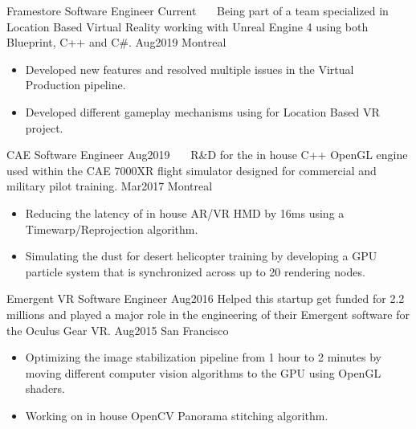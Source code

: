 %
%
%

\begin{experiences}
  \experience
    {Framestore}   			{Software Engineer}
    {Current~~~} 			{Being part of a team specialized in Location Based Virtual Reality working with Unreal Engine 4 using both Blueprint, C++ and C\#.}
	{Aug2019}	 	
	{Montreal}			{
						  \begin{itemize}
							\item Developed new features and resolved multiple issues in the Virtual Production pipeline.
							\item Developed different gameplay mechanisms using for Location Based VR project.
						  \end{itemize}
						 }
   \emptySeparator

  \experience
    {CAE}   				{Software Engineer}
    {Aug2019~~~} 			{R\&D for the in house C++ OpenGL engine used within the CAE 7000XR flight simulator designed for commercial and military pilot training.}
	{Mar2017}	 	
	{Montreal}			{
						  \begin{itemize}
							\item Reducing the latency of in house AR/VR HMD by 16ms using a Timewarp/Reprojection algorithm.
							\item Simulating the dust for desert helicopter training by developing a GPU particle system that is synchronized across up to 20 rendering nodes.
						  \end{itemize}
						 }
   \emptySeparator
   
   \experience
    {Emergent VR} 			{Software Engineer}
    {Aug2016} 				{Helped this startup get funded for 2.2 millions and played a major role in the engineering of their Emergent software for the Oculus Gear VR.}
	{Aug2015}	 	
	{San Francisco}			{
						  \begin{itemize}
							\item Optimizing the image stabilization pipeline from 1 hour to 2 minutes by moving different computer vision algorithms to the GPU using OpenGL shaders.
							\item Working on in house OpenCV Panorama stitching algorithm.
						  \end{itemize}
						 }
   \emptySeparator
   

\end{experiences}
